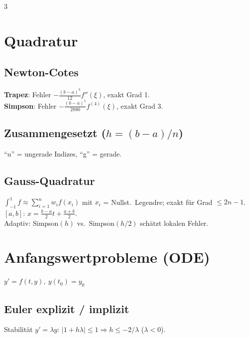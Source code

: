 \documentclass[8pt,a4paper]{extarticle}
\begin{document}
\begin{multicols*}{3}
\section{Quadratur}
\subsection{Newton-Cotes}
\textbf{Trapez}:
Fehler $-\tfrac{(b-a)^3}{12}f''(\xi)$, exakt Grad 1.\\[0.3ex]
\textbf{Simpson}:
Fehler $-\tfrac{(b-a)^5}{2880}f^{(4)}(\xi)$, exakt Grad 3.

\subsection{Zusammengesetzt ($h{=}(b{-}a)/n$)}
``u'' = ungerade Indizes, ``g'' = gerade.

\subsection{Gauss-Quadratur}
$\int_{-1}^1 f\approx\sum_{i=1}^n w_i f(x_i)$ mit $x_i$ = Nullst.\ Legendre; exakt f\"ur Grad $\le 2n{-}1$.\\
$[a,b]$: $x=\tfrac{b-a}{2}t+\tfrac{a+b}{2}$.\\
Adaptiv: Simpson$(h)$ vs.\ Simpson$(h/2)$ sch\"atzt lokalen Fehler.

\section{Anfangswertprobleme (ODE)}
$y'=f(t,y),\ y(t_0)=y_0$
\subsection{Euler explizit / implizit}
Stabilit\"at $y'{=}\lambda y$: $|1+h\lambda|\le 1\Rightarrow h\le -2/\lambda$ ($\lambda<0$).\\


\end{multicols*}
\end{document}
